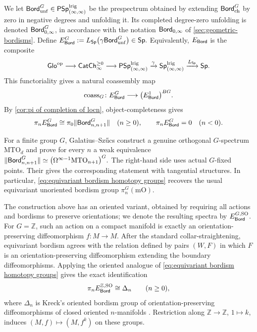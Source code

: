 \documentclass[a4paper,11pt]{article}
\begin{document}
We let
$
  \textup{\textsf{Bord}}_{\mathrm{unf}}^G\in\textup{\textsf{PSp}}_{(\infty,\infty)}^{\text{\textup{lrig}}}
$
be the prespectrum obtained by extending $\textup{\textsf{Bord}}_{\mathrm{ch}}^G$ by zero in
negative degrees and unfolding it.  Its completed degree-zero unfolding
is denoted $\textup{\textsf{Bord}}^{G}_{0,\infty}$, in accordance
with the notation $\textup{\textsf{Bord}}_{0,\infty}$ of
\cref{sec:geometric-bordisms}.  Define
$
  E_{\textup{\textsf{Bord}}}^G
    :=L_{\textup{\textsf{Sp}}}\bigl(\gamma
      \textup{\textsf{Bord}}_{\mathrm{unf}}^G\bigr)\in\textup{\textsf{Sp}}.
$
Equivalently, $E_{\textup{\textsf{Bord}}}$ is the composite
\[
  \Glo^{\op}\longrightarrow\CChp_{\infty}
    \longrightarrow\PSpIIl\xto{\gamma}\SpIIl
    \xto{L_{\Sp}}\Sp.
\]
This functoriality gives a natural coassembly map
\begin{equation}\label{eq:bordism coassembly}
  \operatorname{coass}_G\colon E_{\textup{\textsf{Bord}}}^G\longrightarrow
    \bigl(E_{\textup{\textsf{Bord}}}^1\bigr)^{BG}.
\end{equation}
By \cref{cor:pi of completion of locn}, object-completeness gives
\begin{equation}\label{eq:equivariant bordism homotopy groups}
  \pi_nE_{\textup{\textsf{Bord}}}^G
    \cong\pi_0\|\textup{\textsf{Bord}}^G_{n,n+1}\|
    \quad(n\geq0),
  \qquad
  \pi_nE_{\textup{\textsf{Bord}}}^G=0\quad(n<0).
\end{equation}

For a finite group $G$, Galatius--Sz\H{u}cs \cite[Theorem~1.1]{GalatiusSzucs}
construct a genuine orthogonal $G$-spectrum $\mathrm{MTO}_d$ and prove
for every $n$ a weak equivalence
$
  \|\textup{\textsf{Bord}}^G_{n,n+1}\|
    \simeq\bigl(\Omega^{\infty-1}\mathrm{MTO}_{n+1}\bigr)^G . 
$
The right-hand side uses actual
$G$-fixed points.  Their \cite[Theorem~6.4]{GalatiusSzucs} gives the
corresponding statement with tangential structures.  In particular,
\cref{eq:equivariant bordism homotopy groups} recovers the usual
equivariant unoriented bordism group
$\pi_n^G(\mathrm{mO})$.  

The construction above has an oriented variant, obtained by requiring all
actions and bordisms to preserve orientations; we denote the resulting spectra
by $E_{\textup{\textsf{Bord}}}^{G,\mathrm{SO}}$. For $G=\mathbb Z$, such an action on a
compact manifold is exactly an orientation-preserving diffeomorphism
$f\colon M\to M$.
After the standard collar-straightening, equivariant bordism agrees
with the relation defined by pairs $(W,F)$ in which $F$ is an
orientation-preserving diffeomorphism extending the boundary
diffeomorphisms. Applying the oriented analogue of
\cref{eq:equivariant bordism homotopy groups} gives the exact identification
\begin{equation}\label{eq:Z bordism Kreck}
  \pi_nE_{\textup{\textsf{Bord}}}^{\mathbb Z,\mathrm{SO}}
    \cong\Delta_n\qquad(n\geq0),
\end{equation}
where $\Delta_n$ is Kreck's oriented bordism group of
orientation-preserving diffeomorphisms of closed oriented
$n$-manifolds \cite{KreckDiffeomorphisms}.  Restriction along
$\mathbb Z\to\mathbb Z$, $1\mapsto k$, induces
$(M,f)\mapsto(M,f^k)$ on these groups.
\end{document}
